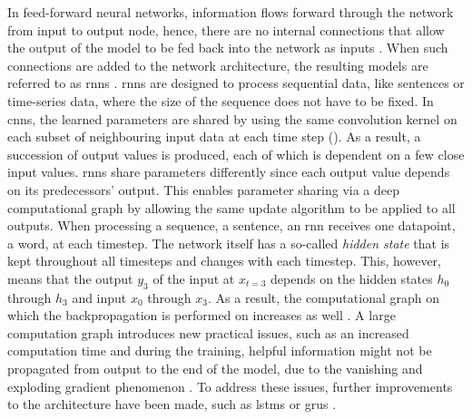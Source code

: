 In feed-forward neural networks, information flows forward through the network from input to output node, hence, there are no internal connections that allow
the output of the model to be fed back into the network as inputs \cite{aggarwal2018NeuralNetworksDeep, Goodfellow-et-al-2016}.
When such connections are added to the network architecture, the resulting models are referred to as \glspl{rnn} \cite{rumelhart1986LearningRepresentationsBackpropagating}.
\Glspl{rnn} are designed to process sequential data, like sentences or time-series data, where the size of the sequence does not have to be fixed.
In \glspl{cnn}, the learned parameters are shared by using the same convolution kernel on each subset of neighbouring input data at each time step (). 
As a result, a succession of output values is produced, each of which is dependent on a few close input values. 
\glspl{rnn} share parameters differently since each output value depends on its predecessors' output. 
This enables parameter sharing via a deep computational graph by allowing the same update algorithm to be applied to all outputs.
When processing a sequence, \eg a sentence, an \gls{rnn} receives one datapoint, \eg a word, at each timestep.
The network itself has a so-called \textit{hidden state} that is kept throughout all timesteps and changes with each timestep.
This, however, means that the output $y_3$ of the input at $x_{t=3}$ depends on the hidden states $h_0$ through $h_3$ and input $x_0$ through $x_3$.
As a result, the computational graph on which the backpropagation is performed on increases as well \cite{aggarwal2018NeuralNetworksDeep}.
A large computation graph introduces new practical issues, such as an increased computation time and during the training, helpful information might not be propagated from output to the end of the model,
due to the vanishing and exploding gradient phenomenon \cite{aggarwal2018NeuralNetworksDeep}.
To address these issues, further improvements to the architecture have been made, such as \glspl{lstm} \cite{hochreiter1997LongShortTermMemory} or \glspl{gru} \cite{cho2014PropertiesNeuralMachine}.

